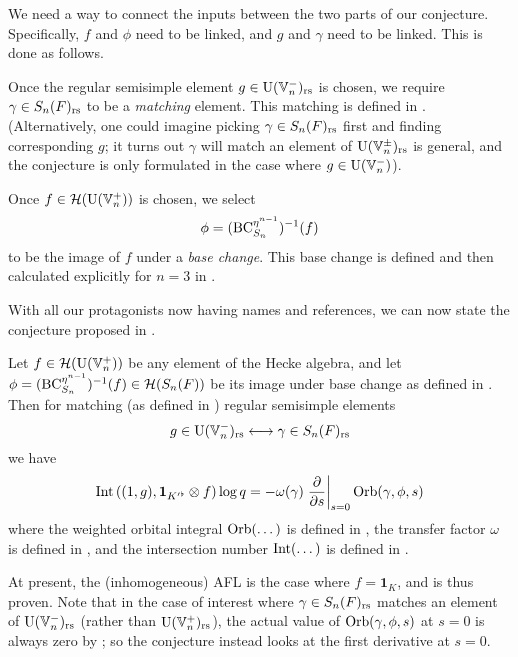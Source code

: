 \begin{itemize}
  \ii We need a way to connect the inputs between the two parts of our conjecture.
  Specifically, $f$ and $\phi$ need to be linked, and $g$ and $\gamma$ need to be linked.
  This is done as follows.
  \begin{itemize}
    \ii Once the regular semisimple element $g \in \operatorname{U}(\mathbb V_n^-)_{\mathrm{rs}}$ is chosen,
    we require $\gamma \in S_n(F)_{\mathrm{rs}}$ to be a \emph{matching} element.
    This matching is defined in .
    (Alternatively, one could imagine picking $\gamma \in S_n(F)_{\mathrm{rs}}$ first
    and finding corresponding $g$;
    it turns out $\gamma$ will match an element of $\operatorname{U}(\mathbb V_n^\pm)_{\mathrm{rs}}$ is general,
    and the conjecture is only formulated in the case where $g \in \operatorname{U}(\mathbb V_n^-)$).

    \ii Once $f \in \mathcal H(\operatorname{U}(\mathbb V_n^+))$ is chosen, we select
    \[ \phi = (\operatorname{BC}_{S_n}^{\eta^{n-1}})^{-1}(f) \]
    to be the image of $f$ under a \emph{base change}.
    This base change is defined and then calculated explicitly for $n = 3$ in .
  \end{itemize}
\end{itemize}
With all our protagonists now having names and references,
we can now state the conjecture proposed in \cite{ref:AFLspherical}.
\begin{conjecture}
  \label{conj:inhomog}
  Let $f \in \mathcal H(\operatorname{U}(\mathbb V_n^+))$ be any element of the Hecke algebra,
  and let $\phi = (\operatorname{BC}_{S_n}^{\eta^{n-1}})^{-1}(f) \in \mathcal H(S_n(F))$ be its image
  under base change as defined in .
  Then for matching (as defined in ) regular semisimple elements
  \[ g \in \operatorname{U}(\mathbb V_n^-)_{\mathrm{rs}} \longleftrightarrow \gamma \in S_n(F)_{\mathrm{rs}} \]
  we have
  \begin{equation}
    \operatorname{Int}\left( (1,g), \mathbf{1}_{K'^\flat} \otimes f \right) \log q
    = -\omega(\gamma) \left. \pdv{}{s} \right\rvert_{s=0} \operatorname{Orb}(\gamma, \phi, s)
    \label{eq:inhomog}
  \end{equation}
  where the weighted orbital integral $\operatorname{Orb}(\dots)$ is defined in ,
  the transfer factor $\omega$ is defined in ,
  and the intersection number $\operatorname{Int}(\dots)$ is defined in .
\end{conjecture}

At present, the (inhomogeneous) AFL is the case where $f = \mathbf{1}_K$,
and is thus proven.
Note that in the case of interest where $\gamma \in S_n(F)_{\mathrm{rs}}$
matches an element of $\operatorname{U}(\mathbb V_n^-)_{\mathrm{rs}}$ (rather than $\operatorname{U}(\mathbb V_n^+)_{\mathrm{rs}}$),
the actual value of $\operatorname{Orb}(\gamma, \phi, s)$ at $s = 0$ is always zero
by ;
so the conjecture instead looks at the first derivative at $s = 0$.


